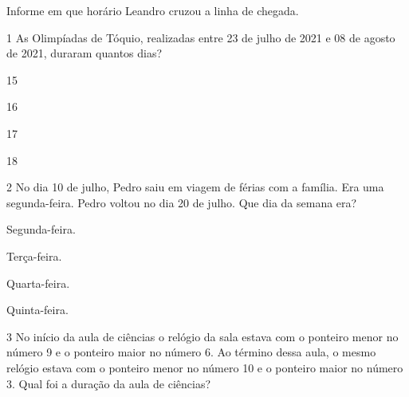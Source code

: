 Informe em que horário Leandro cruzou a linha de chegada.


\pagebreak
{}

\num{1} As Olimpíadas de Tóquio, realizadas entre 23 de julho de 2021 e 08 de
agosto de 2021, duraram quantos dias?

\begin{minipage}{.5\textwidth}
\begin{escolha}
\item 15

\item 16

\item 17

\item 18
\end{escolha}
\end{minipage}

\num{2} No dia 10 de julho, Pedro saiu em viagem de férias com a família. Era
uma segunda-feira. Pedro voltou no dia 20 de julho. Que dia da semana
era?

\begin{minipage}{.5\textwidth}
\begin{escolha}
\item Segunda-feira.

\item Terça-feira.

\item Quarta-feira.

\item Quinta-feira.
\end{escolha}
\end{minipage}

\num{3} No início da aula de ciências o relógio da sala estava com o ponteiro
menor no número 9 e o ponteiro maior no número 6. Ao término dessa
aula, o mesmo relógio estava com o ponteiro menor no número
10 e o ponteiro maior no número 3. Qual foi a duração da aula de
ciências?


